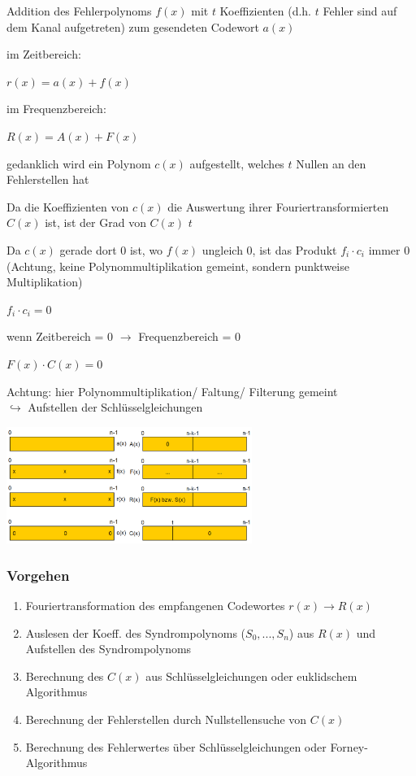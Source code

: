 Addition des Fehlerpolynoms $f(x)$ mit $t$ Koeffizienten (d.h. $t$ Fehler sind auf dem Kanal aufgetreten)
zum gesendeten Codewort $a(x)$

im Zeitbereich:

$\displaystyle{
    r(x) = a(x) + f(x)
}$

im Frequenzbereich:

$\displaystyle{
    R(x) = A(x) + F(x)
}$

gedanklich wird ein Polynom $c(x)$ aufgestellt, welches $t$ Nullen an den Fehlerstellen hat

Da die Koeffizienten von $c(x)$ die Auswertung ihrer Fouriertransformierten $C(x)$ ist, ist der Grad
von $C(x)$ $t$

Da $c(x)$ gerade dort 0 ist, wo $f(x)$ ungleich 0, ist das Produkt $f_i \cdot c_i$ immer 0 (Achtung, keine
Polynommultiplikation gemeint, sondern punktweise Multiplikation)

$\displaystyle{
    f_i \cdot c_i = 0
}$

wenn Zeitbereich = 0 $\rightarrow$ Frequenzbereich = 0

$\displaystyle{
    F(x) \cdot C(x) = 0
}$

Achtung: hier Polynommultiplikation/ Faltung/ Filterung gemeint\\
$\hookrightarrow$ Aufstellen der Schlüsselgleichungen

\includegraphics[width=8cm]{img/decod_rs.PNG}

\subsubsection{Vorgehen}

\begin{enumerate}
    \item Fouriertransformation des empfangenen Codewortes $r(x) \rightarrow R(x)$
    \item Auslesen der Koeff. des Syndrompolynoms ($S_0, ..., S_n$) aus $R(x)$ und Aufstellen des Syndrompolynoms
    \item Berechnung des $C(x)$ aus Schlüsselgleichungen oder euklidschem Algorithmus
    \item Berechnung der Fehlerstellen durch Nullstellensuche von $C(x)$
    \item Berechnung des Fehlerwertes über Schlüsselgleichungen oder Forney-Algorithmus
\end{enumerate}

